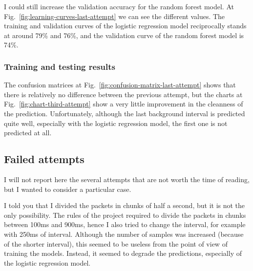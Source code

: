 I could still increase the validation accuracy for the random forest model. At Fig.~\ref{fig:learning-curves-last-attempt} we can see the different values. The training and validation curves of the logistic regression model reciprocally stands at around 79\% and 76\%, and the validation curve of the random forest model is 74\%.

\subsubsection{Training and testing results}

The confusion matrices at Fig.~\ref{fig:confusion-matrix-last-attempt} shows that there is relatively no difference between the previous attempt, but the charts at Fig.~\ref{fig:chart-third-attempt} show a very little improvement in the cleanness of the prediction. Unfortunately, although the last background interval is predicted quite well, especially with the logistic regression model, the first one is not predicted at all.

\subsection{Failed attempts}

I will not report here the several attempts that are not worth the time of reading, but I wanted to consider a particular case.

I told you that I divided the packets in chunks of half a second, but it is not the only possibility. The rules of the project required to divide the packets in chunks between 100ms and 900ms, hence I also tried to change the interval, for example with 250ms of interval. Although the number of samples was increased (because of the shorter interval), this seemed to be useless from the point of view of training the models. Instead, it seemed to degrade the predictions, especially of the logistic regression model.